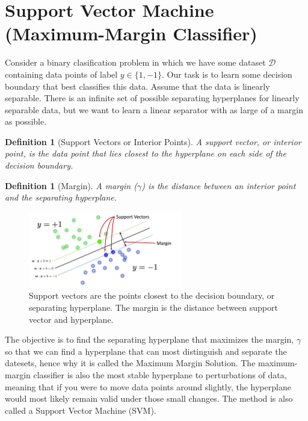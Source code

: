 \documentclass[11pt]{article}
\def\DD{\mathcal{D}}
\newtheorem{definition}[theorem]{Definition}
\begin{document}

\section{Support Vector Machine (Maximum-Margin Classifier)}
Consider a binary clasification problem in which we have some dataset $\DD$ containing data points of label $y \in \{1, -1\}$. Our task is to learn some decision boundary that best classifies this data. Assume that the data is linearly separable. There is an infinite set of possible separating hyperplanes for linearly separable data, but we want to learn a linear separator with as large of a margin as possible.

\begin{definition}[Support Vectors or Interior Points]
A support vector, or interior point, is the data point that lies closest to the hyperplane on each side of the decision boundary.
\end{definition}

\begin{definition}[Margin]
A margin ($\gamma$) is the distance between an interior point and the separating hyperplane. 
\end{definition}

\begin{figure}[H]
    \centering
    \includegraphics[width=0.6\textwidth]{images/support_vector.png}
    \caption{Support vectors are the points closest to the decision boundary, or separating hyperplane. The margin is the distance between support vector and hyperplane.}
    \label{fig:support_vectors}
\end{figure}

The objective is to find the separating hyperplane that maximizes the margin, $\gamma$ so that we can find a hyperplane that can most distinguish and separate the datesets, hence why it is called the Maximum Margin Solution. The maximum-margin classifier is also the most stable hyperplane to perturbations of data, meaning that if you were to move data points around slightly, the hyperplane would most likely remain valid under those small changes. The method is also called a Support Vector Machine (SVM).
\end{document}
